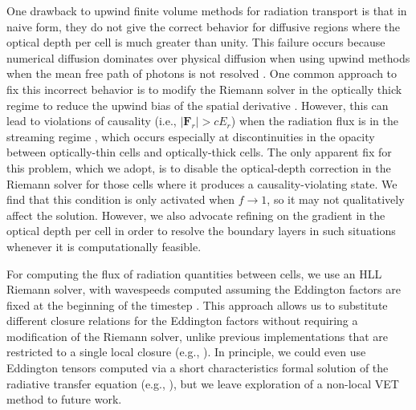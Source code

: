 \documentclass[fleqn,usenatbib]{mnras}
\begin{document}
One drawback to upwind finite volume methods for radiation transport is that in naive form, they do not give the correct behavior for diffusive regions where the optical depth per cell is much greater than unity. This failure occurs because numerical diffusion dominates over physical diffusion when using upwind methods when the mean free path of photons is not resolved \citep{Lowrie_2001}. One common approach to fix this incorrect behavior is to modify the Riemann solver in the optically thick regime to reduce the upwind bias of the spatial derivative \citep{Audit_2002,Skinner_2019,Mezzacappa_2020}. However, this can lead to violations of causality (i.e., $|\mathbf{F}_r| > cE_r$) when the radiation flux is in the streaming regime \citep{Audit_2002}, which occurs especially at discontinuities in the opacity between optically-thin cells and optically-thick cells. The only apparent fix for this problem, which we adopt, is to disable the optical-depth correction in the Riemann solver for those cells where it produces a causality-violating state. We find that this condition is only activated when $f \rightarrow 1$, so it may not qualitatively affect the solution. However, we also advocate refining on the gradient in the optical depth per cell in order to resolve the boundary layers in such situations whenever it is computationally feasible.

For computing the flux of radiation quantities between cells, we use an HLL Riemann solver, with wavespeeds computed assuming the Eddington factors are fixed at the beginning of the timestep \citep{Balsara_1999}. This approach allows us to substitute different closure relations for the Eddington factors without requiring a modification of the Riemann solver, unlike previous implementations that are restricted to a single local closure (e.g., \citealt{Gonzalez_2007,Skinner_2013,Skinner_2019}). In principle, we could even use Eddington tensors computed via a short characteristics formal solution of the radiative transfer equation (e.g., \citealt{Davis_2012}), but we leave exploration of a non-local VET method to future work.
\end{document}
